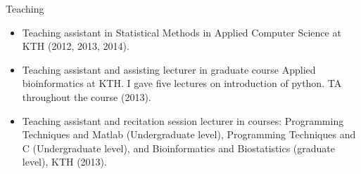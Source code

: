 \documentclass{resume} %
\begin{document}
\begin{rSection}{Teaching}
\begin{itemize}
    \item Teaching assistant in Statistical Methods in Applied Computer Science at KTH (2012, 2013, 2014).
    \item Teaching assistant and assisting lecturer in graduate course Applied bioinformatics at KTH. I gave five lectures on introduction of python. TA throughout the course (2013).
    \item Teaching assistant and recitation session lecturer in courses: Programming Techniques and Matlab (Undergraduate level), Programming Techniques and C (Undergraduate level), and Bioinformatics and Biostatistics (graduate level), KTH (2013).
\end{itemize}




\end{rSection}
\end{document}
